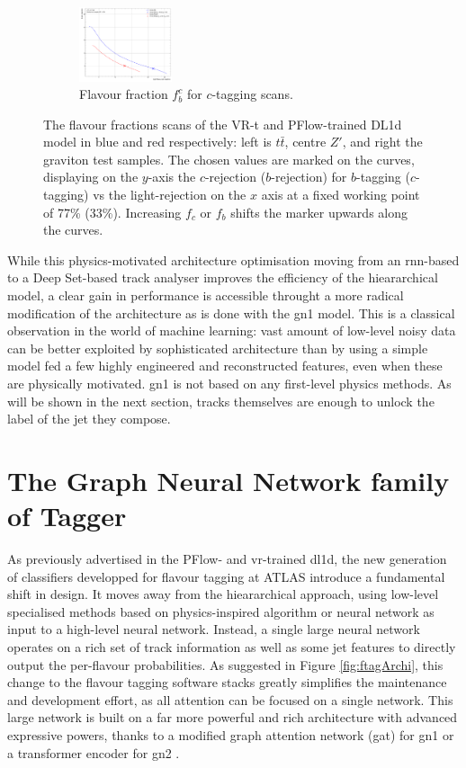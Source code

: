 \begin{figure}[h!]
\begin{subfigure}[b]{0.98\textwidth}
    \includegraphics[width=0.3\textwidth]{Images/FTAG/VRDL1d/scansfraction/thesis_plot_frac_c/contour_fraction_graviton_2000.pdf}
    \caption{Flavour fraction $f_b^c$ for $c$-tagging scans.} 
    \label{fig:DL1dVRscanfc}
\end{subfigure}
  \caption{The flavour fractions scans of the VR-t and PFlow-trained DL1d model in blue and red respectively: left is $t\bar{t}$, centre $Z'$, and right the graviton test samples. The chosen values are marked on the curves, displaying on the $y$-axis the $c$-rejection ($b$-rejection) for $b$-tagging ($c$-tagging) vs the light-rejection on the $x$ axis at a fixed working point of 77\% (33\%). Increasing $f_c$ or $f_b$ shifts the marker upwards along the curves. }
  \label{fig:DL1dVRscanf}
\end{figure} 

While this physics-motivated architecture optimisation moving from an \gls{rnn}-based to a Deep Set-based track analyser improves the efficiency of the hieararchical model, a clear gain in performance is accessible throught a more radical modification of the architecture as is done with the \gls{gn1} model. This is a classical observation in the world of machine learning: vast amount of low-level noisy data can be better exploited by sophisticated architecture than by using a simple model fed a few highly engineered and reconstructed features, even when these are physically motivated. \gls{gn1} is not based on any first-level physics methods. As will be shown in the next section, tracks themselves are enough to unlock the label of the jet they compose. 

\section{The Graph Neural Network family of Tagger}\label{chap:GN}
As previously advertised in the PFlow- and \gls{vr}-trained \gls{dl1d}, the new generation of classifiers developped for flavour tagging at ATLAS introduce a fundamental shift in design. It moves away from the hieararchical approach, using low-level specialised methods based on physics-inspired algorithm or neural network as input to a high-level neural network. Instead, a single large neural network operates on a rich set of track information as well as some jet features to directly output the per-flavour probabilities. As suggested in Figure \ref{fig:ftagArchi}, this change to the flavour tagging software stacks greatly simplifies the maintenance and development effort, as all attention can be focused on a single network. This large network is built on a far more powerful and rich architecture with advanced expressive powers, thanks to a modified graph attention network (\gls{gat}) \cite{velickovic2018graph, brody2022how} for \gls{gn1} or a transformer encoder for \gls{gn2} \cite{NIPS_transformerPaper}. 

